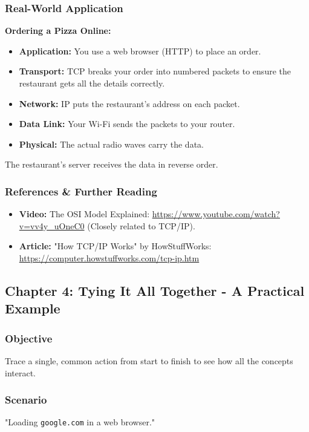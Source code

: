 \documentclass{article}
\begin{document}
\subsubsection{Real-World Application}
\textbf{Ordering a Pizza Online:}
\begin{itemize}
    \item \textbf{Application:} You use a web browser (HTTP) to place an order.
    \item \textbf{Transport:} TCP breaks your order into numbered packets to ensure the restaurant gets all the details correctly.
    \item \textbf{Network:} IP puts the restaurant's address on each packet.
    \item \textbf{Data Link:} Your Wi-Fi sends the packets to your router.
    \item \textbf{Physical:} The actual radio waves carry the data.
\end{itemize}
The restaurant's server receives the data in reverse order.

\subsubsection{References \& Further Reading}
\begin{itemize}
    \item \textbf{Video:} The OSI Model Explained: \url{https://www.youtube.com/watch?v=vv4y_uOneC0} (Closely related to TCP/IP).
    \item \textbf{Article:} "How TCP/IP Works" by HowStuffWorks: \url{https://computer.howstuffworks.com/tcp-ip.htm}
\end{itemize}

\subsection{Chapter 4: Tying It All Together - A Practical Example}
\subsubsection{Objective}
Trace a single, common action from start to finish to see how all the concepts interact.

\subsubsection{Scenario}
"Loading \texttt{google.com} in a web browser."
\end{document}
